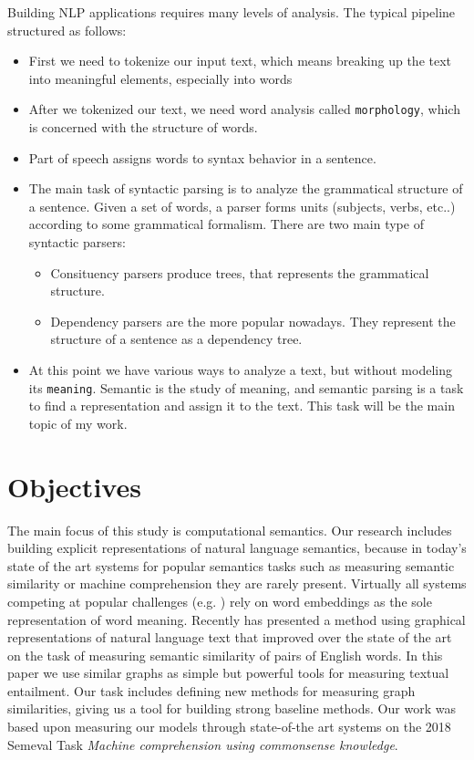 Building NLP applications requires many levels of analysis.
The typical pipeline structured as follows:
\begin{itemize}
	\item First we need to tokenize our input text, which means breaking up the text into meaningful elements, especially into words
	\item After we tokenized our text, we need word analysis called \texttt{morphology}, which is concerned with the structure of words.
	\item Part of speech assigns words to syntax behavior in a sentence.
	\item The main task of syntactic parsing is to analyze the grammatical structure of a sentence. Given a set of words, a parser forms units (subjects, verbs, etc..) according to some grammatical formalism.
	There are two main type of syntactic parsers:
	\begin{itemize}
		\item Consituency parsers produce trees, that represents the grammatical structure.
		\item Dependency parsers are the more popular nowadays. They represent the structure of a sentence as a dependency tree.
	\end{itemize}
	\item At this point we have various ways to analyze a text, but without modeling its \texttt{meaning}. Semantic is the study of meaning, and semantic parsing is a task to find a representation and assign it to the text. This task will be the main topic of my work.
\end{itemize}
\section{Objectives}
The main focus of this study is computational semantics. Our research includes building explicit representations of natural language semantics, because in today's state of the art systems for popular semantics tasks such as measuring semantic similarity or machine comprehension they are rarely present. Virtually all systems
competing at popular challenges (e.g. \cite{Cer:2017,Collados:2017}) rely on word embeddings as the sole representation of word meaning. Recently \cite{Recski:2016c} has presented a method using graphical representations of natural language text that improved over the state of the art on the task of
measuring semantic similarity of pairs of English words. In this paper
we use similar graphs as simple but powerful tools for measuring textual
entailment. Our task includes defining new methods for measuring graph similarities, giving us a tool for building strong baseline methods. Our work was based upon measuring our models through state-of-the art systems on the 2018 Semeval Task \textit{Machine comprehension using commonsense knowledge}.

